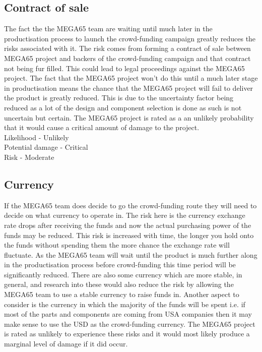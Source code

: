 \subsection{Contract of sale}
The fact the the MEGA65 team are waiting until much later in the productisation process to launch the crowd-funding campaign greatly reduces the risks associated with it. The risk comes from forming a contract of sale between MEGA65 project and backers of the crowd-funding campaign and that contract not being fur filled. This could lead to legal proceedings against the MEGA65 project. The fact that the MEGA65 project won't do this until a much later stage in productisation means the chance that the MEGA65 project will fail to deliver the product is greatly reduced. This is due to the uncertainty factor being reduced as a lot of the design and component selection is done as such is not uncertain but certain. The MEGA65 project is rated as a an unlikely probability that it would cause a critical amount of damage to the project. \\

Likelihood - Unlikely \\
Potential damage - Critical \\
Risk - Moderate \\


\subsection{Currency}
If the MEGA65 team does decide to go the crowd-funding route they will need to decide on what currency to operate in. The risk here is the currency exchange rate drops after receiving the funds and now the actual purchasing power of the funds may be reduced. This risk is increased with time, the longer you hold onto the funds without spending them the more chance the exchange rate will fluctuate. As the MEGA65 team will wait until the product is much further along in the productisation process before crowd-funding this time period will be significantly reduced. There are also some currency which are more stable, in general, and research into these would also reduce the risk by allowing the MEGA65 team to use a stable currency to raise funds in. Another aspect to consider is the currency in which the majority of the funds will be spent i.e. if most of the parts and components are coming from USA companies then it may make sense to use the USD as the crowd-funding currency. The MEGA65 project is rated as unlikely to experience these risks and it would most likely produce a marginal level of damage if it did occur. \\

